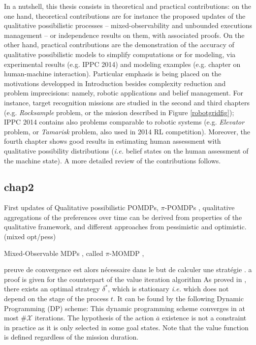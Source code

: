 In a nutshell, 
this thesis consists in
theoretical and practical contributions:
on the one hand, theoretical contributions 
are for instance 
the proposed updates of the qualitative possibilistic processes
-- mixed-observability and unbounded executions management -- 
or independence results on them, with associated proofs.
On the other hand, 
practical contributions
are the demonstration of the accuracy 
of qualitative possibilistic models
to simplify computations or for modeling,
via experimental results (e.g. IPPC 2014) 
and modeling examples (e.g. chapter on human-machine interaction).
Particular emphasis is being placed 
on the motivations developped in Introduction
besides complexity reduction and problem imprecisions:
namely, robotic applications and belief management.
For instance, target recognition missions 
are studied in the second and third chapters 
(e.g. \textit{Rocksample} problem, or the mission described in Figure \ref{robotgridfig});
IPPC 2014 contains also problems comparable to robotic systems 
(e.g. \textit{Elevator} problem, or \textit{Tamarisk} problem, also used in 2014 RL competition). 
Moreover, the fourth chapter shows good results 
in estimating human assessment with qualitative possibility distributions
(\textit{i.e.} belief states on the human assessment of the machine state).
A more detailed review of the contributions follows.


\subsection*{chap2}
First updates of Qualitative possibilistic POMDPs, 
$\pi$-POMDPs \cite{Sabbadin:1999:pipomdp}, 
qualitative aggregations of the preferences over time
can be derived from properties of the qualitative framework,
and different approaches from pessimistic and optimistic.
(mixed opt/pess)

Mixed-Observable MDPs \cite{OngShaoHsuWee-IJRR10}, 
called $\pi$-MOMDP \cite{Drougard13}, 

preuve de convergence est alors n\'ecessaire 
dans le but de calculer une strat\'egie \cite{Drougard13}. 
a proof is given for the counterpart of the value iteration algorithm
As proved in \cite{Drougard13}, there exists an optimal strategy $\delta^{\ast}$, 
which is stationary \textit{i.e.} 
which does not depend on the stage of the process $t$. 
It can be found by the following Dynamic Programming (DP) scheme: 
This dynamic programming scheme converges in at most 
$\# \mathcal{X}$ iterations.
The hypothesis of the action $\overline{a}$ existence
is not a constraint in practice
as it is only selected in some goal states.
Note that the value function is defined regardless of the mission duration.


